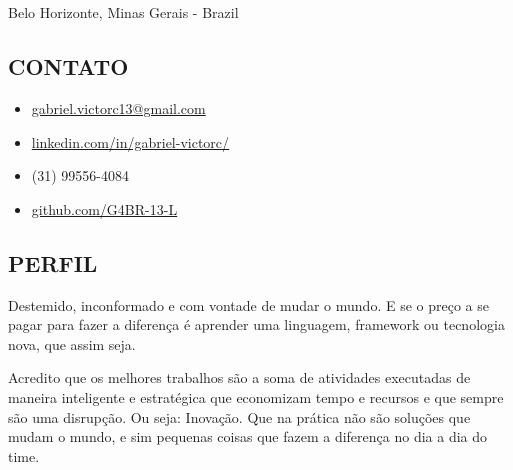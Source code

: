\documentclass[a4paper]{article}
\begin{document}
\begin{multicols}{2}



  {\fontsize{40pt}{46pt}}\\
  \\
  \normalsize{{\Large{}} Belo Horizonte, Minas Gerais - Brazil}

  \begin{framed}
    \section{CONTATO}
    \begin{itemize}[itemsep=1ex]
      \item {\Large{}} \href{mailto:gabriel.victorc13@gmail.com}{gabriel.victorc13@gmail.com}
      \item {\Large{}} \href{https://linkedin.com/in/gabriel-victorc/}{linkedin.com/in/gabriel-victorc/}
      \item {\Large{}} (31) 99556-4084
      \item {\Large{}} \href{https://github.com/G4BR-13-L}{github.com/G4BR-13-L}
    \end{itemize}
  \end{framed}

  \begin{framed}
    \section{PERFIL}

    Destemido, inconformado e com vontade de mudar o mundo. E se o preço a se pagar para fazer a diferença é aprender uma linguagem, framework ou tecnologia nova, que assim seja.

    Acredito que os melhores trabalhos são a soma de atividades executadas de maneira inteligente e estratégica que economizam tempo e recursos e que sempre são uma disrupção. Ou seja: Inovação. Que na prática não são soluções que mudam o mundo, e sim pequenas coisas que fazem a diferença no dia a dia do time.
  \end{framed}

  \begin{framed}

\end{framed}
\end{multicols}
\end{document}

